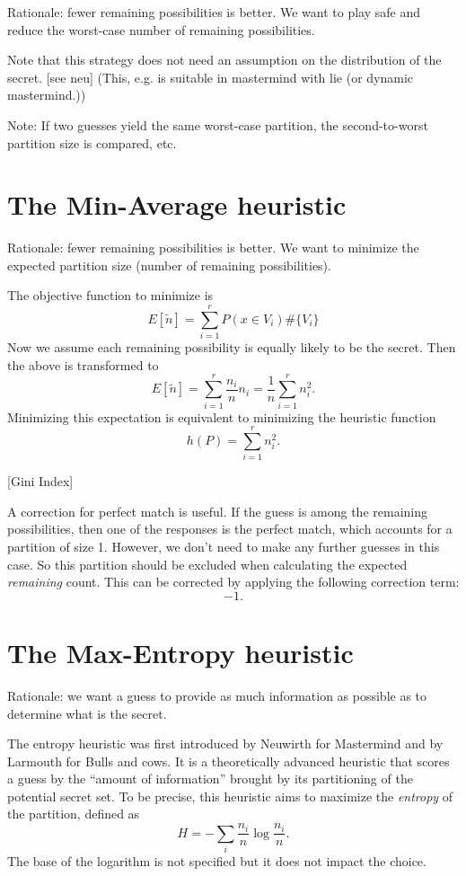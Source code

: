 Rationale: fewer remaining possibilities is better. We want to play safe and reduce the worst-case number of remaining possibilities. 

Note that this strategy does not need an assumption on the distribution of the secret. [see neu] (This, e.g. is suitable in mastermind with lie (or dynamic mastermind.))

Note: If two guesses yield the same worst-case partition, the second-to-worst partition size is compared, etc.

\section{The Min-Average heuristic}

Rationale: fewer remaining possibilities is better. We want to minimize the expected partition size (number of remaining possibilities).

The objective function to minimize is
\[
E[\tilde{n}] = \sum_{i=1}^r P(x \in V_i) \# \{ V_i \}
\]
Now we assume each remaining possibility is equally likely to be the secret. Then the above is transformed to
\[
E[\tilde{n}] = \sum_{i=1}^r \frac{n_i}{n} n_i = \frac{1}{n}  \sum_{i=1}^r n_i^2 .
\]
Minimizing this expectation is equivalent to minimizing the heuristic function
\[
h(P) = \sum_{i=1}^r n_i^2 .
\]


[Gini Index]

A correction for perfect match is useful. If the guess is among the remaining possibilities, then one of the responses is the perfect match, which accounts for a partition of size 1. However, we don't need to make any further guesses in this case. So this partition should be excluded when calculating the expected \emph{remaining} count. This can be corrected by applying the following correction term:
\[
-1 .
\]

\section{The Max-Entropy heuristic}

Rationale: we want a guess to provide as much information as possible as to determine what is the secret.

The entropy heuristic was first introduced by Neuwirth \cite{neuwirth81} for Mastermind and by Larmouth \cite{aleph71} for Bulls and cows. It is a theoretically advanced heuristic that scores a guess by the ``amount of information'' brought by its partitioning of the potential secret set. To be precise, this heuristic aims to maximize the \emph{entropy} of the partition, defined as
\[
H = -\sum_i \frac{n_i}{n} \log \frac{n_i}{n} .
\]
The base of the logarithm is not specified but it does not impact the choice. 

